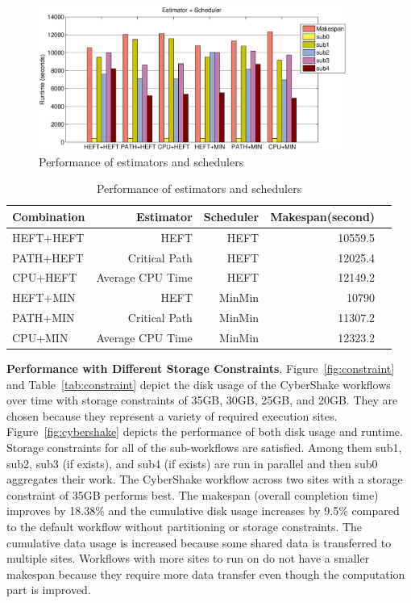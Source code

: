 \begin{figure}[h!]
	\centering
    \includegraphics[width=0.9\textwidth]{figures/partitioning/estimator.eps}
    \caption{Performance of estimators and schedulers}
    \label{fig:scheduler}
\end{figure}

\begin{table}[h!]
\caption{Performance of estimators and schedulers}
\label{tab:scheduler}
\centering
\begin{tabular}{lrrrr}
\hline
Combination     &     Estimator &     Scheduler &    Makespan(second)  \\
\hline
HEFT+HEFT & HEFT & HEFT & 10559.5\\
PATH+HEFT & Critical Path & HEFT & 12025.4\\
CPU+HEFT & Average CPU Time & HEFT & 12149.2\\
HEFT+MIN & HEFT & MinMin & 10790 \\
PATH+MIN & Critical Path & MinMin & 11307.2 \\
CPU+MIN & Average CPU Time & MinMin & 12323.2\\
\hline
\end{tabular}
\end{table} 

\textbf{Performance with Different Storage Constraints}. Figure~\ref{fig:constraint} and Table~\ref{tab:constraint} depict the disk usage of the CyberShake workflows over time with storage constraints of 35GB, 30GB, 25GB, and 20GB. They are chosen because they represent a variety of required execution sites. Figure~\ref{fig:cybershake} depicts the performance of both disk usage and runtime. Storage constraints for all of the sub-workflows are satisfied. Among them sub1, sub2, sub3 (if exists), and sub4 (if exists) are run in parallel and then sub0 aggregates their work. The CyberShake workflow across two sites with a storage constraint of 35GB performs best. The makespan (overall completion time) improves by 18.38\% and the cumulative disk usage increases by 9.5\% compared to the default workflow without partitioning or storage constraints. The cumulative data usage is increased because some shared data is transferred to multiple sites. Workflows with more sites to run on do not have a smaller makespan because they require more data transfer even though the computation part is improved. 


